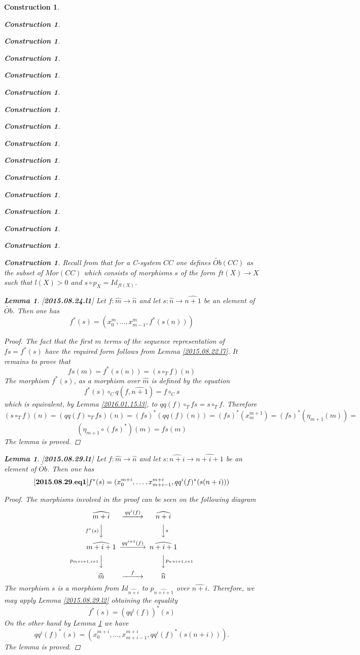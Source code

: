 \documentclass[12pt]{amsart}
\newenvironment{eq}{\begin{equation}}{\end{equation}}
\newtheorem{lemma}[proposition]{Lemma}
\newtheorem{construction}[proposition]{Construction}
\newcommand{\llabel}[1]{\label{#1}[{\bf #1}]}
\newcommand{\sr}{\rightarrow}
\newcommand{\wt}{\widetilde}
\newcommand{\wh}{\widehat}
\newcommand{\mbind}[1]{{#1^*}}
\newcommand{\hc}{\circ_{T}}
\begin{document}
\begin{construction}
\begin{construction}
\begin{construction}
\begin{construction}
\begin{construction}
\begin{construction}
\begin{construction}
\begin{construction}
\begin{construction}
\begin{construction}
\begin{construction}
\begin{construction}
\begin{construction}
\begin{construction}
\begin{construction}
\begin{construction}
Recall from \cite{Csubsystems} that for a C-system $CC$ one defines $\wt{Ob}(CC)$ as the subset of $Mor(CC)$ which consists of morphisms $s$ of the form $ft(X)\sr X$ such that $l(X)>0$ and $s\circ p_X=Id_{ft(X)}$. 
%
\begin{lemma}
\llabel{2015.08.24.l1}
Let $f:\wh{m}\sr\wh{n}$ and let $s:\wh{n}\sr\wh{n+1}$ be an element of $\wt{Ob}$. Then one has
%
$$f^*(s)=(x_0^m,\dots,x_{m-1}^m,\mbind{f}(s(n)))$$
%
\end{lemma}
%
\begin{proof}
The fact that the first $m$ terms of the sequence representation of $fs=f^*(s)$ have the required form follows from Lemma \ref{2015.08.22.l7}. It remains to prove that
%
$$fs(m)=\mbind{f}(s(n))=(s\hc f)(n)$$
%
The morphism $f^*(s)$, as a morphism over $\wh{m}$ is defined by the equation
%
$$f^*(s)\circ_C q(f,\wh{n+1})=f\circ_C s$$
%
which is equivalent, by Lemma \ref{2016.01.15.l3},  to $qq(f)\hc fs=s\hc f$. Therefore 
%
$$(s\hc f)(n)=(qq(f)\hc fs)(n)=\mbind{(fs)}(qq(f)(n))=\mbind{(fs)}(x_m^{m+1})=\mbind{(fs)}(\eta_{m+1}(m))=$$$$(\eta_{m+1}\circ\mbind{(fs)})(m)=fs(m)$$ 
%
The lemma is proved.
\end{proof}
%
\begin{lemma}
\llabel{2015.08.29.l1}
Let $f:\wh{m}\sr\wh{n}$ and let $s:\wh{n+i}\sr\wh{n+i+1}$ be an element of $\wt{Ob}$. Then one has
%
\begin{eq}\llabel{2015.08.29.eq1}
f^*(s)=(x_0^{m+i},\dots,x_{m+i-1}^{m+i},\mbind{qq^i(f)}(s(n+i)))
\end{eq}
%
\end{lemma}
%
\begin{proof}
The morphisms involved in the proof can be seen on the following diagram
%
$$
\begin{CD}
\wh{m+i} @>qq^i(f)>> \wh{n+i}\\
@Vf^*(s)VV @VVsV\\
\wh{m+i+1} @>qq^{i+1}(f)>> \wh{n+i+1}\\
@Vp_{m+i+1,i+1}VV @VVp_{n+i+1,i+1}V\\
\wh{m} @>f>> \wh{n}
\end{CD}
$$
%
The morphism $s$ is a morphism from $Id_{\wh{n+i}}$ to $p_{\wh{n+i+1}}$ over $\wh{n+i}$. Therefore, we may apply Lemma \ref{2015.08.29.l2} obtaining the equality
%
$$f^*(s)=(qq^i(f))^*(s)$$
%
On the other hand by Lemma \ref{2015.08.24.l1} we have
%
$$qq^i(f)^*(s)=(x_0^{m+i},\dots,x_{m+i-1}^{m+i},\mbind{qq^i(f)}(s(n+i))).$$
%
The lemma is proved. 
\end{proof}
%

\end{construction}
\end{construction}
\end{construction}
\end{construction}
\end{construction}
\end{construction}
\end{construction}
\end{construction}
\end{construction}
\end{construction}
\end{construction}
\end{construction}
\end{construction}
\end{construction}
\end{construction}
\end{construction}
\end{document}
